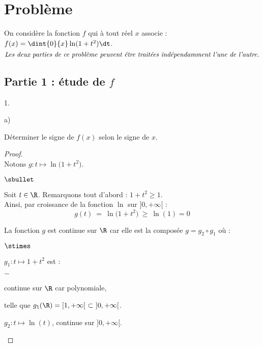 \documentclass[11pt]{article}%
\begin{document}


\section*{Problème}

\noindent
On considère la fonction $f$ qui à tout réel $x$ associe : $f(x) =
\dint{0}{x} \ln(1+ t^2) \dt$.
\[
\mbox{\it Les deux parties de ce problème peuvent être traitées
  indépendamment l'une de l'autre.}
\]

\subsection*{Partie 1 : étude de $f$}

\begin{noliste}{1.}
  \setlength{\itemsep}{4mm}
\item
  \begin{noliste}{a)}
    \setlength{\itemsep}{2mm}
  \item Déterminer le signe de $f(x)$ selon le signe de $x$.
  \end{noliste}
    
  \begin{proof}~\\%
    Notons $g : t \mapsto \ln\big( 1 + t^2 \big)$.
    \begin{noliste}{$\sbullet$}
    \item Soit $t \in \R$. Remarquons tout d'abord : $1 + t^2 \geq 1$.\\
      Ainsi, par croissance de la fonction $\ln$ sur $]0, +\infty[$ :
      \[
      g(t) \ = \ \ln\big( 1 + t^2 \big) \ \geq \ \ln(1) = 0
      \]

    \item La fonction $g$ est continue sur $\R$ car elle est la
      composée $g = g_2 \circ g_1$ où :
      \begin{noliste}{$\stimes$}
      \item $g_1 : t \mapsto 1 + t^2$ est : 
        \begin{noliste}{$-$}
        \item continue sur $\R$ car polynomiale,
        \item telle que $g_1(\R) = [1, +\infty[ \ \subset \ ]0,
          +\infty[$.
        \end{noliste}
        
      \item $g_2 : t \mapsto \ln(t)$, continue sur $]0, +\infty[$.
      \end{noliste}


\end{noliste}
\end{proof}
\end{noliste}
\end{document}
